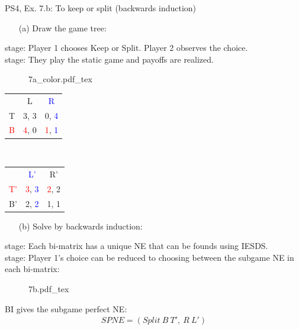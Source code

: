 \begin{frame}{PS4, Ex. 7.b: To keep or split (backwards induction)}
  \begin{multicols}{2}
    \begin{itemize}
      \item[(a)] Draw the game tree:
    \end{itemize}
     stage: Player 1 chooses Keep or Split. Player 2 observes the choice.\\\medskip
     stage: They play the static game and payoffs are realized.
    \begin{figure}[!h]
      \center
      \def\svgwidth{.5\columnwidth}
      {7a_color.pdf_tex}
    \end{figure}
    \vspace{-14pt}
    \begin{table}
      \begin{tabular}{l|c|c|}
        \multicolumn{1}{c}{} & \multicolumn{1}{c}{L} & \multicolumn{1}{c}{\textcolor{blue}{R}} \\\cline{2-3}
        T & 3, 3 & 0, \textcolor{blue}{4} \\\cline{2-3}
        \textcolor{red}{B} & \textcolor{red}{4}, 0 & \textcolor{red}{1}, \textcolor{blue}{1} \\\cline{2-3}
        \end{tabular}\
        \begin{tabular}{l|c|c|}
          \multicolumn{1}{c}{} & \multicolumn{1}{c}{\textcolor{blue}{L'}} & \multicolumn{1}{c}{R'} \\\cline{2-3}
          \textcolor{red}{T'} & \textcolor{red}{3}, \textcolor{blue}{3} & \textcolor{red}{2}, 2 \\\cline{2-3}
          B' & 2, \textcolor{blue}{2} & 1, 1 \\\cline{2-3}
        \end{tabular}
    \end{table}
  \vfill\null \columnbreak
    \begin{itemize}
      \item[(b)] Solve by backwards induction:
    \end{itemize}
     stage: Each bi-matrix has a unique NE that can be founds using IESDS.\\\medskip
    \nth{1} stage: Player 1's choice can be reduced to choosing between the subgame NE in each bi-matrix:
    \begin{figure}[!h]
      \center
      \def\svgwidth{.5\columnwidth}
      {7b.pdf_tex}
    \end{figure}
    BI gives the subgame perfect NE:
    \begin{align*}
      SPNE=(Split\ B\ T',\ R\ L')
    \end{align*}
  \vfill\null
  \end{multicols}
\end{frame}

